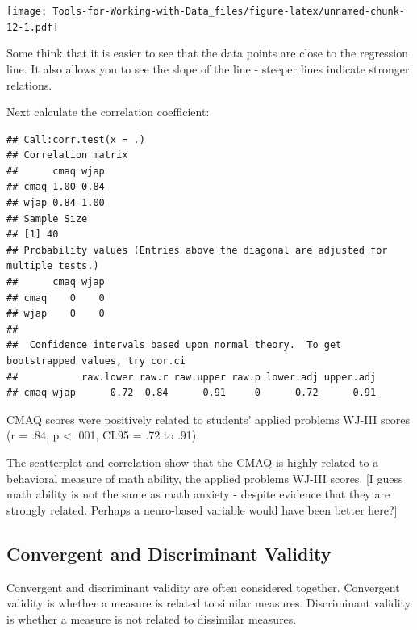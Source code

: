 \documentclass[
]{book}
\newenvironment{Shaded}{\begin{snugshade}}{\end{snugshade}}
\newcommand{\DataTypeTok}[1]{\textcolor[rgb]{0.13,0.29,0.53}{#1}}
\newcommand{\KeywordTok}[1]{\textcolor[rgb]{0.13,0.29,0.53}{\textbf{#1}}}
\newcommand{\NormalTok}[1]{#1}
\newcommand{\OperatorTok}[1]{\textcolor[rgb]{0.81,0.36,0.00}{\textbf{#1}}}
\newcommand{\OtherTok}[1]{\textcolor[rgb]{0.56,0.35,0.01}{#1}}
\newcommand{\StringTok}[1]{\textcolor[rgb]{0.31,0.60,0.02}{#1}}
\begin{document}
\texttt{[image: Tools-for-Working-with-Data\_files/figure-latex/unnamed-chunk-12-1.pdf]}

Some think that it is easier to see that the data points are close to the regression line. It also allows you to see the slope of the line - steeper lines indicate stronger relations.

Next calculate the correlation coefficient:

\begin{Shaded}
\end{Shaded}

\begin{verbatim}
## Call:corr.test(x = .)
## Correlation matrix 
##      cmaq wjap
## cmaq 1.00 0.84
## wjap 0.84 1.00
## Sample Size 
## [1] 40
## Probability values (Entries above the diagonal are adjusted for multiple tests.) 
##      cmaq wjap
## cmaq    0    0
## wjap    0    0
## 
##  Confidence intervals based upon normal theory.  To get bootstrapped values, try cor.ci
##           raw.lower raw.r raw.upper raw.p lower.adj upper.adj
## cmaq-wjap      0.72  0.84      0.91     0      0.72      0.91
\end{verbatim}

CMAQ scores were positively related to students' applied problems WJ-III scores (r = .84, p \textless{} .001, CI.95 = .72 to .91).

The scatterplot and correlation show that the CMAQ is highly related to a behavioral measure of math ability, the applied problems WJ-III scores. {[}I guess math ability is not the same as math anxiety - despite evidence that they are strongly related. Perhaps a neuro-based variable would have been better here?{]}

\hypertarget{convergent-and-discriminant-validity}{%
\subsection{Convergent and Discriminant Validity}\label{convergent-and-discriminant-validity}}

Convergent and discriminant validity are often considered together. Convergent validity is whether a measure is related to similar measures. Discriminant validity is whether a measure is not related to dissimilar measures.
\end{document}
